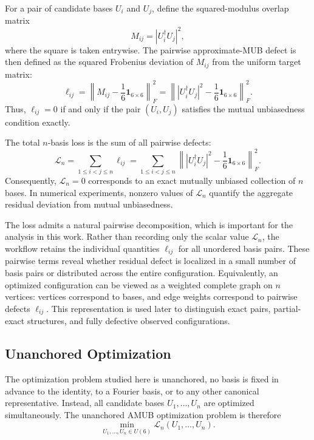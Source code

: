 \documentclass[a4paper,twocolumn,11pt,amsfonts,amssymb]{quantumarticle}
\begin{document}
For a pair of candidate bases $U_i$ and $U_j$, define the squared-modulus overlap matrix
\[
M_{ij} = |U_i^\dagger U_j|^2,
\]
where the square is taken entrywise. The pairwise approximate-MUB defect is then defined as the squared Frobenius deviation of \(M_{ij}\) from the uniform target matrix:
\begin{equation}
    \ell_{ij}
    =
    \left\|
    M_{ij}
    -
    \frac{1}{6}\mathbf{1}_{6 \times 6}
    \right\|_F^2
    =
    \left\|
    |U_i^\dagger U_j|^2
    -
    \frac{1}{6}\mathbf{1}_{6 \times 6}
    \right\|_F^2 .
    \label{eq:pairwise-loss}
\end{equation}
Thus, \(\ell_{ij}=0\) if and only if the pair \((U_i,U_j)\) satisfies the mutual unbiasedness condition exactly.

The total $n$-basis loss is the sum of all pairwise defects:
\begin{equation}
    \mathcal{L}_n
    =
    \sum_{1 \leq i < j \leq n}
    \ell_{ij}
    =
    \sum_{1 \leq i < j \leq n}
    \left\|
    |U_i^\dagger U_j|^2
    -
    \frac{1}{6}\mathbf{1}_{6 \times 6}
    \right\|_F^2 .
    \label{eq:total-loss}
\end{equation}
Consequently, $\mathcal{L}_n=0$ corresponds to an exact mutually unbiased collection of $n$ bases. In numerical experiments, nonzero values of $\mathcal{L}_n$ quantify the aggregate residual deviation from mutual unbiasedness.

The loss admits a natural pairwise decomposition, which is important for the analysis in this work. Rather than recording only the scalar value \(\mathcal{L}_n\), the workflow retains the individual quantities \(\ell_{ij}\) for all unordered basis pairs. These pairwise terms reveal whether residual defect is localized in a small number of basis pairs or distributed across the entire configuration. Equivalently, an optimized configuration can be viewed as a weighted complete graph on \(n\) vertices: vertices correspond to bases, and edge weights correspond to pairwise defects \(\ell_{ij}\). This representation is used later to distinguish exact pairs, partial-exact structures, and fully defective observed configurations.

\subsection{Unanchored Optimization}

The optimization problem studied here is unanchored, no basis is fixed in advance to the identity, to a Fourier basis, or to any other canonical representative. Instead, all candidate bases $U_1,\ldots,U_n$ are optimized simultaneously. The unanchored AMUB optimization problem is therefore
\begin{equation}
    \min_{U_1,\ldots,U_n \in U(6)}
    \mathcal{L}_n(U_1,\ldots,U_n).
    \label{eq:unanchored-optimization}
\end{equation}
\end{document}
